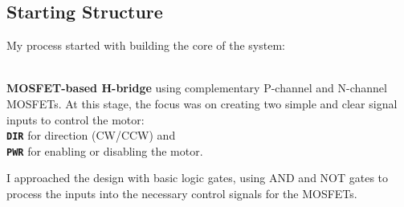 \documentclass{article}
\begin{document}
\subsection{Starting Structure}
\begin{minipage}{0.4\textwidth}
\begin{minipage}{1.6\textwidth}
My process started with building the core of the system:
\end{minipage}\\[8pt] 
\textbf{MOSFET-based H-bridge} using complementary P-channel and N-channel MOSFETs. At this stage, the focus was on creating two simple and clear signal inputs to control the motor:\\[8pt] 
\textbf{\texttt{DIR}} for direction (CW/CCW) and\\ \textbf{\texttt{PWR}} for enabling or disabling the motor.\\[8pt]
\begin{minipage}{1.6\textwidth}
 I approached the design with basic logic gates, using {AND} and {NOT} gates to process the inputs into the necessary control signals for the MOSFETs. 
\end{minipage}
\end{minipage}\hspace*{0.4em}
\end{document}
